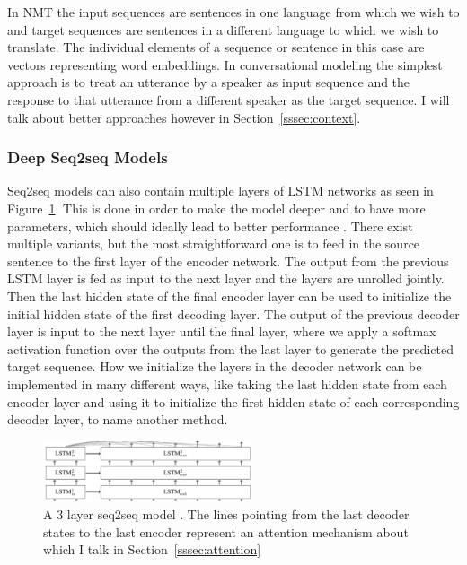 \documentclass[12pt]{article}
\begin{document}
In NMT the input sequences are sentences in one language from which we wish to and target sequences are sentences in a different language to which we wish to translate. The individual elements of a sequence or sentence in this case are vectors representing word embeddings. In conversational modeling the simplest approach is to treat an utterance by a speaker as input sequence and the response to that utterance from a different speaker as the target sequence. I will talk about better approaches however in Section~\ref{sssec:context}.
\subsubsection{Deep Seq2seq Models}
Seq2seq models can also contain multiple layers of LSTM networks as seen in Figure~\ref{fig:232b}. This is done in order to make the model deeper and to have more parameters, which should ideally lead to better performance \cite{Vinyals:2015,googleNMT:2016}. There exist multiple variants, but the most straightforward one is to feed in the source sentence to the first layer of the encoder network. The output from the previous LSTM layer is fed as input to the next layer and the layers are unrolled jointly. Then the last hidden state of the final encoder layer can be used to initialize the initial hidden state of the first decoding layer. The output of the previous decoder layer is input to the next layer until the final layer, where we apply a softmax activation function over the outputs from the last layer to generate the predicted target sequence. How we initialize the layers in the decoder network can be implemented in many different ways, like taking the last hidden state from each encoder layer and using it to initialize the first hidden state of each corresponding decoder layer, to name another method.

\begin{figure}[H]
	\label{fig:232b}
	\centering
	\includegraphics[width=0.55\textwidth]{pics/deep_seq2seq.png}
	\caption{A 3 layer seq2seq model \cite{deep_seq2seq}. The lines pointing from the last decoder states to the last encoder represent an attention mechanism about which I talk in Section~\ref{sssec:attention}}
\end{figure}
\end{document}
